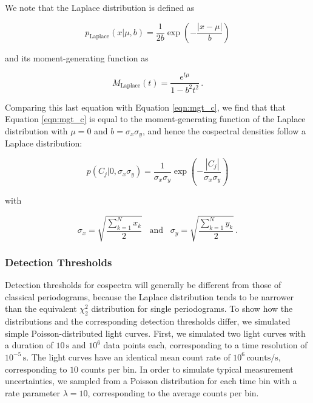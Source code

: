 \documentclass[12pt]{emulateapj}
\begin{document}
\noindent We note that the Laplace distribution is defined as 

\[
p_{\mathrm{Laplace}}(x | \mu, b) = \frac{1}{2b} \exp{\left(-\frac{|x - \mu|}{b} \right)}
\]

\noindent and its moment-generating function as

\[
M_\mathrm{Laplace}(t) = \frac{e^{t\mu}}{1 - b^2 t^2} \, .
\]

Comparing this last equation with Equation \ref{eqn:mgt_c}, we find that that Equation \ref{eqn:mgt_c} is equal to the moment-generating function of the Laplace distribution with $\mu = 0$ and $b = \sigma_x \sigma_y$, and hence the cospectral densities follow a Laplace distribution:

\begin{equation}
p(C_j | 0, \sigma_x\sigma_y) = \frac{1}{\sigma_x \sigma_y} \exp{\left(- \frac{|C_j|}{\sigma_x\sigma_y} \right)} 
\label{eqn:laplace}
\end{equation}

\noindent with

\begin{equation}
\sigma_x =  \sqrt{\frac{\sum_{k=1}^{N}{x_k}}{2}} \;\;\; \mathrm{and} \;\;\; \sigma_y =  \sqrt{\frac{\sum_{k=1}^{N}{y_k}}{2}} \, .
\label{eqn:csdist}
\end{equation}


\subsubsection{Detection Thresholds}
\label{sec:detectionthresholds}

Detection thresholds for cospectra will generally be different from those of classical periodograms, because the Laplace distribution tends to be narrower than the equivalent $\chi^2_2$ distribution for single periodograms. To show how the distributions and the corresponding detection thresholds differ, we simulated simple Poisson-distributed light curves. First, we simulated two light curves with a duration of $10\,\mathrm{s}$ and $10^6$ data points each, corresponding to a time resolution of $10^{-5}\,\mathrm{s}$. The light curves have an identical mean count rate of $10^{6} \, \mathrm{counts/s}$, corresponding to $10$ counts per bin. In order to simulate typical measurement uncertainties, we sampled from a Poisson distribution for each time bin with a rate parameter $\lambda = 10$, corresponding to the average counts per bin.
\end{document}
